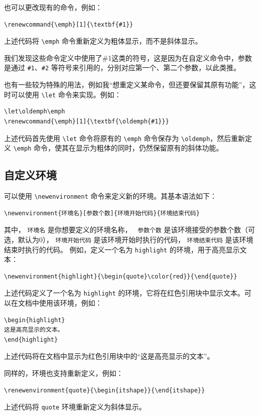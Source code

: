 也可以更改现有的命令，例如：
\begin{verbatim}
\renewcommand{\emph}[1]{\textbf{#1}}
\end{verbatim}
上述代码将 \verb|\emph| 命令重新定义为粗体显示，而不是斜体显示。

我们发现这些命令定义中使用了\#1这类的符号，这是因为在自定义命令中，参数是通过 \verb|#1|、\verb|#2| 等符号来引用的，分别对应第一个、第二个参数，以此类推。

也有一些较为特殊的用法，例如我“想重定义某命令，但还要保留其原有功能”，这时可以使用 \verb|\let| 命令来实现。例如：
\begin{verbatim}
\let\oldemph\emph
\renewcommand{\emph}[1]{\textbf{\oldemph{#1}}}
\end{verbatim}
上述代码首先使用 \verb|\let| 命令将原有的 \verb|\emph| 命令保存为 \verb|\oldemph|，然后重新定义 \verb|\emph| 命令，使其在显示为粗体的同时，仍然保留原有的斜体功能。

\subsection{自定义环境}
可以使用 \verb|\newenvironment| 命令来定义新的环境。其基本语法如下：
\begin{verbatim}
\newenvironment{环境名}[参数个数]{环境开始代码}{环境结束代码}
\end{verbatim}
其中， \verb|环境名| 是你想要定义的环境名称， \verb| 参数个数| 是该环境接受的参数个数（可选，默认为0）， \verb|环境开始代码| 是该环境开始时执行的代码， \verb|环境结束代码| 是该环境结束时执行的代码。 例如，定义一个名为 \verb|highlight| 的环境，用于高亮显示文本：
\begin{verbatim}
\newenvironment{highlight}{\begin{quote}\color{red}}{\end{quote}}
\end{verbatim}
上述代码定义了一个名为 \verb|highlight| 的环境，它将在红色引用块中显示文本。可以在文档中使用该环境，例如：
\begin{verbatim}
\begin{highlight}
这是高亮显示的文本。
\end{highlight}
\end{verbatim}
上述代码将在文档中显示为红色引用块中的“这是高亮显示的文本”。

同样的，环境也支持重新定义，例如：
\begin{verbatim}
\renewenvironment{quote}{\begin{itshape}}{\end{itshape}}
\end{verbatim}
上述代码将 \verb|quote| 环境重新定义为斜体显示。

